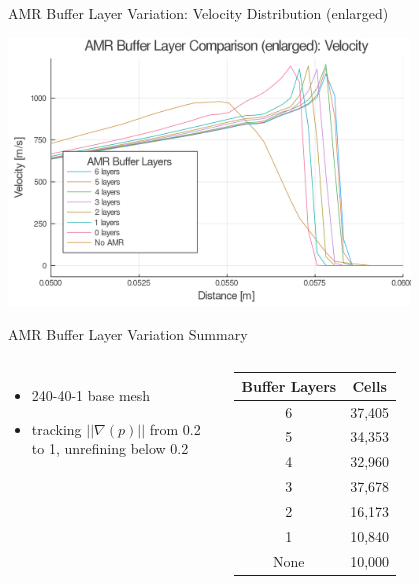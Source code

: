 \begin{frame}{AMR Buffer Layer Variation: Velocity Distribution (enlarged)}
\begin{center}
\includegraphics[width=0.8\textwidth]{../figs/amrfigs/amr_bufflayers/ue.png}
\end{center}
\end{frame}

\begin{frame}{AMR Buffer Layer Variation Summary}
\begin{columns}
\begin{itemize}
\item 240-40-1 base mesh
\item tracking $||\nabla (p)||$ from 0.2 to 1, unrefining below 0.2
\end{itemize}
\begin{table}[h]
\centering
\begin{tabular}{cc}
Buffer Layers & Cells \\ \hline
6 & 37,405 \\ 
5 & 34,353 \\
4 & 32,960 \\
3 & 37,678 \\
2 & 16,173 \\
1 & 10,840 \\
None & 10,000 \\
\end{tabular}
\end{table}


\end{columns}
\end{frame}